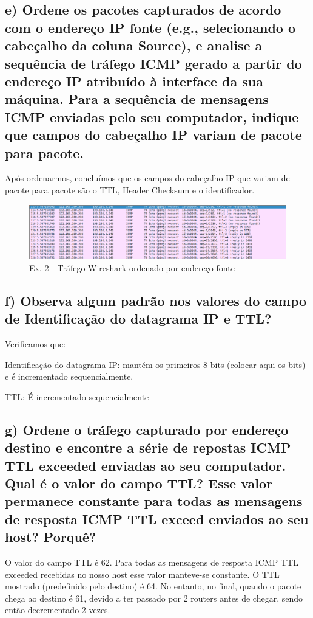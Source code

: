 \documentclass[a4paper]{report}
\begin{document}
\subsection{e) Ordene os pacotes capturados de acordo com o endereço IP 
fonte (e.g., selecionando o cabeçalho
da coluna Source), e analise a sequência de tráfego ICMP gerado a partir 
do endereço IP atribuído à interface da sua máquina. Para a sequência 
de mensagens ICMP enviadas pelo seu computador, indique que campos do 
cabeçalho IP variam de pacote para pacote.}

Após ordenarmos, concluímos que os campos do cabeçalho IP que variam de 
pacote para pacote são o TTL, Header Checksum e o identificador.

\begin{figure}[H]
    \centering 
    \includegraphics[width=\textwidth]{images/wiresharkSourceEx2.png}
    \caption{Ex. 2 - Tráfego Wireshark ordenado por endereço fonte}
    \label{fig:wiresharkSourceEx2}
\end{figure}

\subsection{f) Observa algum padrão nos valores do campo de Identificação do datagrama IP e TTL?}

Verificamos que:

Identificação do datagrama IP: mantém os primeiros 8 bits (colocar aqui os bits)
e é incrementado sequencialmente.

TTL: É incrementado sequencialmente

\subsection{g) Ordene o tráfego capturado por endereço destino e encontre a 
série de repostas ICMP TTL exceeded enviadas ao seu computador. Qual é o
valor do campo TTL? Esse valor permanece constante para todas as mensagens 
de resposta ICMP TTL exceed enviados ao seu host? Porquê?}

O valor do campo TTL é 62.
Para todas as mensagens de resposta ICMP TTL exceeded recebidas no nosso host
esse valor manteve-se constante. O TTL mostrado (predefinido pelo destino) é 64.
No entanto, no final, quando o pacote chega ao destino é 61, devido a ter passado
por 2 routers antes de chegar, sendo então decrementado 2 vezes.
\end{document}
